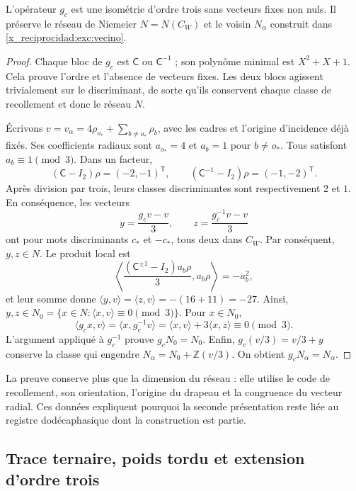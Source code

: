 \begin{proposition}
\label{x_reciprocidad:km:estabilidad-vecino}
L'opérateur \(g_c\) est une isométrie d'ordre trois sans vecteurs fixes non nuls. Il préserve le réseau de Niemeier \(N=N(C_W)\) et le voisin \(N_\alpha\) construit dans \eqref{x_reciprocidad:exc:vecino}.
\end{proposition}
\begin{proof}
Chaque bloc de \(g_c\) est \(\mathsf C\) ou \(\mathsf C^{-1}\) ;
son polynôme minimal est \(X^2+X+1\). Cela prouve l'ordre et
l'absence de vecteurs fixes. Les deux blocs agissent trivialement sur le
discriminant, de sorte qu'ils conservent chaque classe de recollement et donc
le réseau \(N\).

Écrivons \(v=v_\alpha=4\rho_{o_*}+\sum_{b\ne o_*}\rho_b\),
avec les cadres et l'origine d'incidence déjà fixés. Ses coefficients
radiaux sont \(a_{o_*}=4\) et \(a_b=1\) pour \(b\ne o_*\).
Tous satisfont \(a_b\equiv1\pmod3\). Dans un facteur,
\[
 (\mathsf C-I_2)\rho=(-2,-1)^{\mathsf T},\qquad
 (\mathsf C^{-1}-I_2)\rho=(-1,-2)^{\mathsf T}.
\]
Après division par trois, leurs classes discriminantes sont respectivement \(2\) et \(1\). En conséquence, les vecteurs
\begin{equation}
 y=\frac{g_cv-v}{3},\qquad z=\frac{g_c^{-1}v-v}{3}
 \label{x_reciprocidad:km:desplazamientos}
\end{equation}
ont pour mots discriminants \(c_*\) et \(-c_*\), tous deux dans
\(C_W\). Par conséquent, \(y,z\in N\). Le produit local est
\[
 \left\langle
 \frac{(\mathsf C^{\pm1}-I_2)a_b\rho}{3},a_b\rho
 \right\rangle=-a_b^2,
\]
et leur somme donne \(\langle y,v\rangle=\langle z,v\rangle=-(16+11)=-27\). Ainsi, \(y,z\in N_0=\{x\in N:\langle x,v\rangle\equiv0\pmod3\}\). Pour \(x\in N_0\),
\[
 \langle g_cx,v\rangle
 =\langle x,g_c^{-1}v\rangle
 =\langle x,v\rangle+3\langle x,z\rangle\equiv0\pmod3.
\]
L'argument appliqué à \(g_c^{-1}\) prouve \(g_cN_0=N_0\).
Enfin, \(g_c(v/3)=v/3+y\) conserve la classe qui engendre
\(N_\alpha=N_0+\mathbb Z(v/3)\). On obtient
\(g_cN_\alpha=N_\alpha\).
\end{proof}

La preuve conserve plus que la dimension du réseau : elle utilise le code de recollement, son orientation, l'origine du drapeau et la congruence du vecteur radial. Ces données expliquent pourquoi la seconde présentation reste liée au registre dodécaphasique dont la construction est partie.

\subsection{Trace ternaire, poids tordu et extension d'ordre trois}
\label{x_reciprocidad:km:orbifold-tres}

